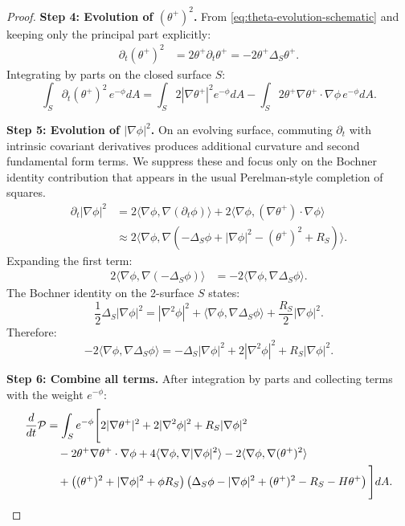 \begin{proof}
\textbf{Step 4: Evolution of $(\theta^+)^2$.}
From \eqref{eq:theta-evolution-schematic} and keeping only the principal part explicitly:
\begin{align}
\partial_t(\theta^+)^2 &= 2\theta^+\partial_t\theta^+ = -2\theta^+\Delta_S\theta^+.
\end{align}
Integrating by parts on the closed surface $S$:
\begin{equation}
\int_S \partial_t(\theta^+)^2 \, e^{-\phi}dA = \int_S 2|\nabla\theta^+|^2 e^{-\phi}dA - \int_S 2\theta^+\nabla\theta^+\cdot\nabla\phi \, e^{-\phi}dA.
\label{eq:theta-sq-evol}
\end{equation}

\textbf{Step 5: Evolution of $|\nabla\phi|^2$.}
On an evolving surface, commuting $\partial_t$ with intrinsic covariant derivatives produces additional curvature and second fundamental form terms. We suppress these and focus only on the Bochner identity contribution that appears in the usual Perelman-style completion of squares.
\begin{align}
\partial_t|\nabla\phi|^2 &= 2\langle\nabla\phi, \nabla(\partial_t\phi)\rangle + 2\langle\nabla\phi, (\nabla\theta^+)\cdot\nabla\phi\rangle \\
&\approx 2\langle\nabla\phi, \nabla(-\Delta_S\phi + |\nabla\phi|^2 - (\theta^+)^2 + R_S)\rangle.
\end{align}
Expanding the first term:
\begin{align}
2\langle\nabla\phi, \nabla(-\Delta_S\phi)\rangle &= -2\langle\nabla\phi, \nabla\Delta_S\phi\rangle.
\end{align}
The Bochner identity on the 2-surface $S$ states:
\begin{equation}
\frac{1}{2}\Delta_S|\nabla\phi|^2 = |\nabla^2\phi|^2 + \langle\nabla\phi, \nabla\Delta_S\phi\rangle + \frac{R_S}{2}|\nabla\phi|^2.
\end{equation}
Therefore:
\begin{equation}
-2\langle\nabla\phi, \nabla\Delta_S\phi\rangle = -\Delta_S|\nabla\phi|^2 + 2|\nabla^2\phi|^2 + R_S|\nabla\phi|^2.
\end{equation}

\textbf{Step 6: Combine all terms.}
After integration by parts and collecting terms with the weight $e^{-\phi}$:
\begin{align}
\frac{d}{dt}\mathcal{P} &= \int_S e^{-\phi}\Bigg[2|\nabla\theta^+|^2 + 2|\nabla^2\phi|^2 + R_S|\nabla\phi|^2 \notag\\
&\quad - 2\theta^+\nabla\theta^+\cdot\nabla\phi + 4\langle\nabla\phi, \nabla|\nabla\phi|^2\rangle - 2\langle\nabla\phi, \nabla(\theta^+)^2\rangle \notag\\
&\quad + \left((\theta^+)^2 + |\nabla\phi|^2 + \phi R_S\right)\left(\Delta_S\phi - |\nabla\phi|^2 + (\theta^+)^2 - R_S - H\theta^+\right)\Bigg]dA.
\label{eq:P-evolution-full}
\end{align}


\end{proof}
